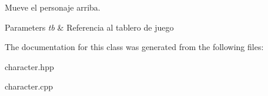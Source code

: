 Mueve el personaje arriba. 


\begin{DoxyParams}{Parameters}
{\em tb} & Referencia al tablero de juego \\
\hline
\end{DoxyParams}


The documentation for this class was generated from the following files\-:\begin{DoxyCompactItemize}
\item 
character.\-hpp\item 
character.\-cpp\end{DoxyCompactItemize}
